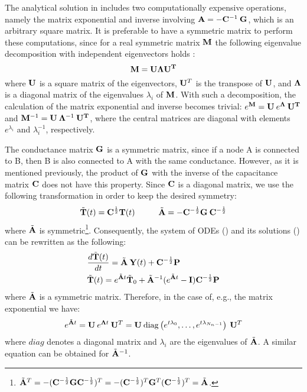 The analytical solution in  includes two computationally
expensive operations, namely the matrix exponential and inverse involving
\mbox{$\mathbf{A} = - \mathbf{C}^{-1} \: \mathbf{G}$}, which is an arbitrary square matrix. It
is preferable to have a symmetric matrix to perform these computations, since
for a real symmetric matrix $\mathbf{M}$ the following eigenvalue decomposition with
independent eigenvectors holds \cite{press2007}:
\begin{equation} \elab{eigenvalue-decomposition}
  \m{M} = \m{U} \m{\Lambda} \m{U}^\v{T}
\end{equation}
where $\mathbf{U}$ is a square matrix of the eigenvectors, $\mathbf{U}^T$ is the transpose
of $\mathbf{U}$, and $\mathbf{\Lambda}$ is a diagonal matrix of the eigenvalues
$\lambda_i$ of $\mathbf{M}$. With such a decomposition, the calculation of the matrix
exponential and inverse becomes trivial: $e^{\mathbf{M}} = \mathbf{U} \: e^{\mathbf{\Lambda}} \:
\mathbf{U}^{\mathbf{T}}$ and $\mathbf{M}^{-1} = \mathbf{U} \: \mathbf{\Lambda}^{-1} \: \mathbf{U}^{\mathbf{T}}$, where
the central matrices are diagonal with elements $e^{\lambda_i}$ and
$\lambda_i^{-1}$, respectively.

The conductance matrix $\mathbf{G}$ is a symmetric matrix, since if a node A is
connected to B, then B is also connected to A with the same conductance.
However, as it is mentioned previously, the product of $\mathbf{G}$ with the inverse
of the capacitance matrix $\mathbf{C}$ does not have this property. Since $\mathbf{C}$ is
a diagonal matrix, we use the following transformation in order to keep the
desired symmetry:
\begin{equation} \elab{substitution}
  \tilde{\v{T}}(t) = \m{C}^{\frac{1}{2}} \v{T}(t) \hspace{10mm} \tilde{\m{A}} = -\m{C}^{-\frac{1}{2}} \m{G} \: \m{C}^{-\frac{1}{2}}
\end{equation}
where $\tilde{\mathbf{A}}$ is symmetric\footnote{$\tilde{\mathbf{A}}^T = -(\mathbf{C}^{-\frac{1}{2}} \mathbf{G}
\mathbf{C}^{-\frac{1}{2}})^T = -(\mathbf{C}^{-\frac{1}{2}})^T \mathbf{G}^T
(\mathbf{C}^{-\frac{1}{2}})^T = \tilde{\mathbf{A}}$.}. Consequently, the system of ODEs
() and its solutions () can be
rewritten as the following:
\begin{align*}
  & \frac{d\tilde{\mathbf{T}}(t)}{dt} = \tilde{\mathbf{A}} \: \mathbf{Y}(t) + \mathbf{C}^{-\frac{1}{2}} \mathbf{P} \\
  & \tilde{\mathbf{T}}(t) = e^{\tilde{\mathbf{A}} t} \tilde{\mathbf{T}}_0 + \tilde{\mathbf{A}}^{-1} (e^{\tilde{\mathbf{A}} t} - \mathbf{I}) \mathbf{C}^{-\frac{1}{2}} \mathbf{P}
\end{align*}
where $\tilde{\mathbf{A}}$ is a symmetric matrix. Therefore, in the case of, e.g.,
the matrix exponential we have:
\begin{equation} \elab{matrix-exponential}
  e^{\tm{A} t} = \m{U} \: e^{\m{\Lambda} t} \: \m{U}^T = \m{U} \: \diagonal{e^{t \lambda_0}}{e^{t \lambda_{N_n - 1}}} \: \m{U}^T
\end{equation}
where $diag$ denotes a diagonal matrix and $\lambda_i$ are the eigenvalues of
$\tilde{\mathbf{A}}$. A similar equation can be obtained for $\tilde{\mathbf{A}}^{-1}$.

